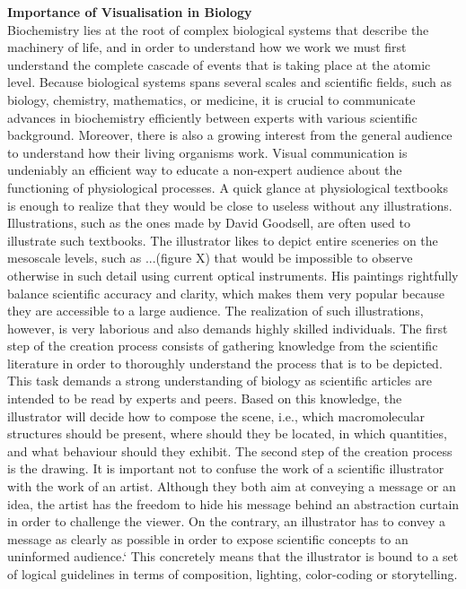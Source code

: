 \textbf{Importance of Visualisation in Biology} \\
Biochemistry lies at the root of complex biological systems that describe the machinery of life, and in order to understand how we work we must first understand the complete cascade of events that is taking place at the atomic level.
Because biological systems spans several scales and scientific fields, such as biology, chemistry, mathematics, or medicine, it is crucial to communicate advances in biochemistry efficiently between experts with various scientific background.
Moreover, there is also a growing interest from the general audience to understand how their living organisms work.
Visual communication is undeniably an efficient way to educate a non-expert audience about the functioning of physiological processes.
A quick glance at physiological textbooks is enough to realize that they would be close to useless without any illustrations.
Illustrations, such as the ones made by David Goodsell, are often used to illustrate such textbooks.
The illustrator likes to depict entire sceneries on the mesoscale levels, such as ...(figure X) that would be impossible to observe otherwise in such detail using current optical instruments.
His paintings rightfully balance scientific accuracy and clarity, which makes them very popular because they are accessible to a large audience. 
The realization of such illustrations, however, is very laborious and also demands highly skilled individuals.
The first step of the creation process consists of gathering knowledge from the scientific literature in order to thoroughly understand the process that is to be depicted.
This task demands a strong understanding of biology as scientific articles are intended to be read by experts and peers.
Based on this knowledge, the illustrator will decide how to compose the scene, i.e., which macromolecular structures should be present, where should they be located, in which quantities, and what behaviour should they exhibit.
The second step of the creation process is the drawing. 
It is important not to confuse the work of a scientific illustrator with the work of an artist.
Although they both aim at conveying a message or an idea, the artist has the freedom to hide his message behind an abstraction curtain in order to challenge the viewer.
On the contrary, an illustrator has to convey a message as clearly as possible in order to expose scientific concepts to an uninformed audience.`
This concretely means that the illustrator is bound to a set of logical guidelines in terms of composition, lighting, color-coding or storytelling.

